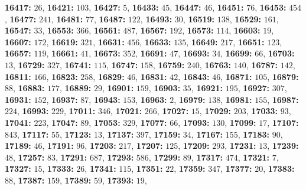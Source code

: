 \textsf{\bfseries 16417:} $26$, \textsf{\bfseries 16421:} $103$, \textsf{\bfseries 16427:} $5$, \textsf{\bfseries 16433:} $45$, \textsf{\bfseries 16447:} $46$, \textsf{\bfseries 16451:} $76$, \textsf{\bfseries 16453:} $454$, \textsf{\bfseries 16477:} $241$, \textsf{\bfseries 16481:} $77$, \textsf{\bfseries 16487:} $122$, \textsf{\bfseries 16493:} $30$, \textsf{\bfseries 16519:} $138$, \textsf{\bfseries 16529:} $161$, \textsf{\bfseries 16547:} $33$, \textsf{\bfseries 16553:} $366$, \textsf{\bfseries 16561:} $487$, \textsf{\bfseries 16567:} $192$, \textsf{\bfseries 16573:} $114$, \textsf{\bfseries 16603:} $19$, \textsf{\bfseries 16607:} $172$, \textsf{\bfseries 16619:} $321$, \textsf{\bfseries 16631:} $456$, \textsf{\bfseries 16633:} $135$, \textsf{\bfseries 16649:} $217$, \textsf{\bfseries 16651:} $123$, \textsf{\bfseries 16657:} $119$, \textsf{\bfseries 16661:} $41$, \textsf{\bfseries 16673:} $352$, \textsf{\bfseries 16691:} $47$, \textsf{\bfseries 16693:} $34$, \textsf{\bfseries 16699:} $66$, \textsf{\bfseries 16703:} $13$, \textsf{\bfseries 16729:} $327$, \textsf{\bfseries 16741:} $115$, \textsf{\bfseries 16747:} $158$, \textsf{\bfseries 16759:} $240$, \textsf{\bfseries 16763:} $140$, \textsf{\bfseries 16787:} $142$, \textsf{\bfseries 16811:} $166$, \textsf{\bfseries 16823:} $258$, \textsf{\bfseries 16829:} $46$, \textsf{\bfseries 16831:} $42$, \textsf{\bfseries 16843:} $46$, \textsf{\bfseries 16871:} $105$, \textsf{\bfseries 16879:} $88$, \textsf{\bfseries 16883:} $177$, \textsf{\bfseries 16889:} $29$, \textsf{\bfseries 16901:} $159$, \textsf{\bfseries 16903:} $35$, \textsf{\bfseries 16921:} $195$, \textsf{\bfseries 16927:} $307$, \textsf{\bfseries 16931:} $152$, \textsf{\bfseries 16937:} $87$, \textsf{\bfseries 16943:} $153$, \textsf{\bfseries 16963:} $2$, \textsf{\bfseries 16979:} $138$, \textsf{\bfseries 16981:} $155$, \textsf{\bfseries 16987:} $224$, \textsf{\bfseries 16993:} $229$, \textsf{\bfseries 17011:} $346$, \textsf{\bfseries 17021:} $266$, \textsf{\bfseries 17027:} $15$, \textsf{\bfseries 17029:} $203$, \textsf{\bfseries 17033:} $93$, \textsf{\bfseries 17041:} $223$, \textsf{\bfseries 17047:} $89$, \textsf{\bfseries 17053:} $329$, \textsf{\bfseries 17077:} $66$, \textsf{\bfseries 17093:} $130$, \textsf{\bfseries 17099:} $17$, \textsf{\bfseries 17107:} $843$, \textsf{\bfseries 17117:} $55$, \textsf{\bfseries 17123:} $13$, \textsf{\bfseries 17137:} $397$, \textsf{\bfseries 17159:} $34$, \textsf{\bfseries 17167:} $155$, \textsf{\bfseries 17183:} $90$, \textsf{\bfseries 17189:} $46$, \textsf{\bfseries 17191:} $96$, \textsf{\bfseries 17203:} $217$, \textsf{\bfseries 17207:} $125$, \textsf{\bfseries 17209:} $293$, \textsf{\bfseries 17231:} $13$, \textsf{\bfseries 17239:} $48$, \textsf{\bfseries 17257:} $83$, \textsf{\bfseries 17291:} $687$, \textsf{\bfseries 17293:} $586$, \textsf{\bfseries 17299:} $89$, \textsf{\bfseries 17317:} $474$, \textsf{\bfseries 17321:} $7$, \textsf{\bfseries 17327:} $15$, \textsf{\bfseries 17333:} $26$, \textsf{\bfseries 17341:} $115$, \textsf{\bfseries 17351:} $22$, \textsf{\bfseries 17359:} $347$, \textsf{\bfseries 17377:} $20$, \textsf{\bfseries 17383:} $88$, \textsf{\bfseries 17387:} $159$, \textsf{\bfseries 17389:} $59$, \textsf{\bfseries 17393:} $19$, 
